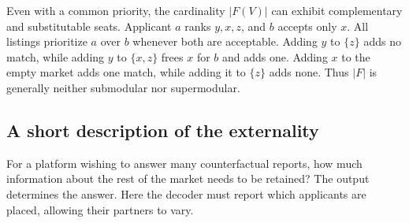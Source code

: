 Even with a common priority, the cardinality $|F(V)|$ can exhibit complementary and substitutable seats. Applicant $a$ ranks $y,x,z$, and $b$ accepts only $x$. All listings prioritize $a$ over $b$ whenever both are acceptable. Adding $y$ to $\{z\}$ adds no match, while adding $y$ to $\{x,z\}$ frees $x$ for $b$ and adds one. Adding $x$ to the empty market adds one match, while adding it to $\{z\}$ adds none. Thus $|F|$ is generally neither submodular nor supermodular.


\subsection{A short description of the externality}
For a platform wishing to answer many counterfactual reports, how much information about the rest of the market needs to be retained? The output determines the answer. Here the decoder must report which applicants are placed, allowing their partners to vary.

